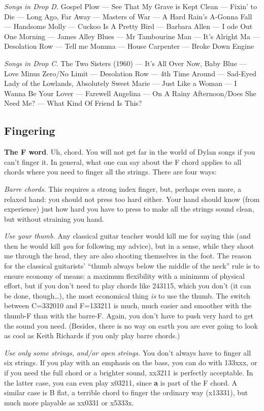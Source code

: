 \begin{articlelayout}
\emph{Songs in Drop D.} Gospel Plow --- See That My Grave is Kept
Clean --- Fixin' to Die --- Long Ago, Far Away --- Masters of War ---
A Hard Rain's A-Gonna Fall --- Handsome Molly --- Cuckoo Is A Pretty
Bird --- Barbara Allen --- I ode Out One Morning --- James Alley Blues
--- Mr Tambourine Man --- It's Alright Ma --- Desolation Row --- Tell
me Momma --- House Carpenter --- Broke Down Engine

\emph{Songs in Drop C.} The Two Sisters (1960) --- It's All Over Now,
Baby Blue --- Love Minus Zero/No Limit --- Desolation Row ---
4th Time Around --- Sad-Eyed Lady of the
Lowlands, Absolutely Sweet Marie --- Just Like a
Woman --- I Wanna Be Your Lover --- Farewell Angelina --- On A Rainy
Afternoon/Does She Need Me? --- What Kind Of Friend Is This?


\subsection*{Fingering}

\textbf{The F word}. Uh, chord. You will not get far in the world of
Dylan songs if you can't finger it. In general, what one can say about
the F chord applies to all chords where you need to finger all the
strings. There are four ways:

\emph{Barre chords.} This requires a strong index finger, but, perhaps
even more, a relaxed hand: you should not press too hard either. Your
hand should know (from experience) just how hard you have to press to
make all the strings sound clean, but without straining you hand.

\emph{Use your thumb.} Any classical guitar teacher would kill me for
saying this (and then he would kill \emph{you} for following my
advice), but in a sense, while they shoot me through the head, they
are also shooting themselves in the foot. The reason for the classical guitarists' ``{}thumb
always below the middle of the neck''{} rule is to ensure economy of means: a maximum
flexibility with a minimum of physical effort, but if you don't
need to play chords like 243115, which you don't (it can be done,
though\ldots{}), the most economical thing \emph{is} to use the
thumb. The switch between C=332010 and F=133211 is much, much easier
and smoother with the thumb-F than with the barre-F. Again, you don't
have to push very hard to get the sound you need. (Besides, there is
no way on earth you are ever going to look as cool as Keith Richards
if you only play barre chords.)

\emph{Use only some strings, and/or open strings.} You don't always
have to finger all six strings. If you play with an emphasis on the
bass, you can do with 133xxx, or if you need the full chord or a
brighter sound, xx3211 is perfectly acceptable. In the latter case,
you can even play x03211, since \textbf{a} is part of the F chord. A
similar case is B flat, a terrible chord to finger the ordinary way
(x13331), but much more playable as xx0331 or x5333x.


\end{articlelayout}
